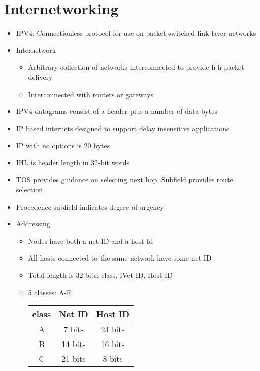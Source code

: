 \documentclass{article}
\begin{document}
    \section{Internetworking}
    \begin{itemize}
        \item IPV4: Connectionless protocol for use on packet switched link layer networks
        \item Internetwork
        \begin{itemize}
            \item Arbitrary collection of networks interconnected to provide h-h packet delivery
            \item Interconnected with routers or gateways
        \end{itemize}
        \item IPV4 datagrams consist of a header plus a number of data bytes
        \item IP based internets designed to support delay insensitive applications
        \item IP with no options is 20 bytes
        \item IHL is header length in 32-bit words
        \item TOS provides guidance on selecting next hop. Subfield provides route selection
        \item Procedence subfield indicates degree of urgency
        \item Addressing
        \begin{itemize}
            \item Nodes have both a net ID and a host Id
            \item All hosts connected to the same network have some net ID
            \item Total length is 32 bits: class, IVet-ID, Host-ID
            \item 5 classes: A-E
            \begin{center}
            \begin{tabular}{| c | c | c |}
                \hline
                class & Net ID & Host ID \\
                \hline
                A & 7 bits & 24 bits \\
                B & 14 bits & 16 bits \\
                C & 21 bits & 8 bits \\
                \hline
            \end{tabular}
            \end{center}

\end{itemize}
\end{itemize}
\end{document}
